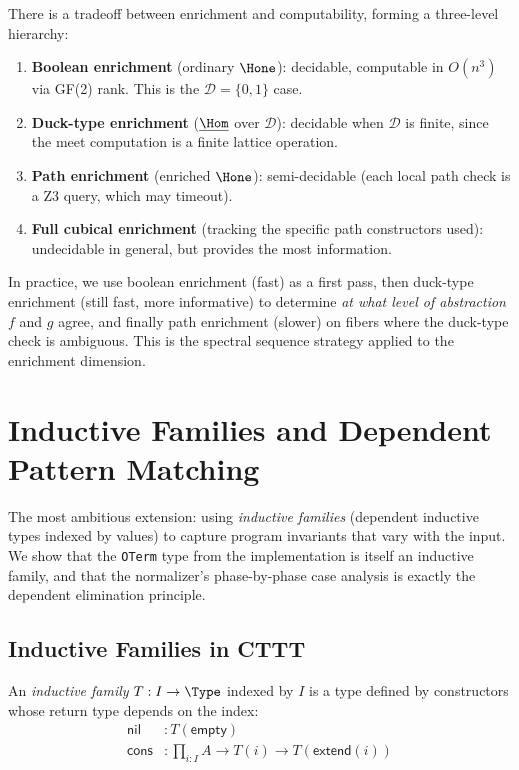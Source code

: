 \begin{proposition}
\label{prop:enrichment-hierarchy}
There is a tradeoff between enrichment and computability, forming
a three-level hierarchy:
\begin{enumerate}
  \item \textbf{Boolean enrichment} (ordinary $\Hone$): decidable,
    computable in $O(n^3)$ via GF(2) rank.  This is the
    $\mathcal{D} = \{0,1\}$ case.
  \item \textbf{Duck-type enrichment} ($\underline{\Hom}$ over
    $\mathcal{D}$): decidable when $\mathcal{D}$ is finite, since
    the meet computation is a finite lattice operation.
  \item \textbf{Path enrichment} (enriched $\Hone$): semi-decidable
    (each local path check is a Z3 query, which may timeout).
  \item \textbf{Full cubical enrichment} (tracking the specific
    path constructors used): undecidable in general, but provides
    the most information.
\end{enumerate}
\end{proposition}

In practice, we use boolean enrichment (fast) as a first pass, then
duck-type enrichment (still fast, more informative) to determine
\emph{at what level of abstraction} $f$ and $g$ agree, and finally
path enrichment (slower) on fibers where the duck-type check is
ambiguous.  This is the spectral sequence strategy applied to the
enrichment dimension.


\chapter{Inductive Families and Dependent Pattern Matching}
\label{ch:inductive-families}

The most ambitious extension: using \emph{inductive families} (dependent
inductive types indexed by values) to capture program invariants
that vary with the input.  We show that the \texttt{OTerm} type
from the implementation is itself an inductive family, and that the
normalizer's phase-by-phase case analysis is exactly the dependent
elimination principle.

\section{Inductive Families in CTTT}

\begin{definition}
An \emph{inductive family} $T : I \to \Type$ indexed by $I$ is a type
defined by constructors whose return type depends on the index:
\begin{align}
  \mathsf{nil} &: T(\mathsf{empty}) \\
  \mathsf{cons} &: \prod_{i : I} A \to T(i) \to T(\mathsf{extend}(i))
\end{align}
\end{definition}

